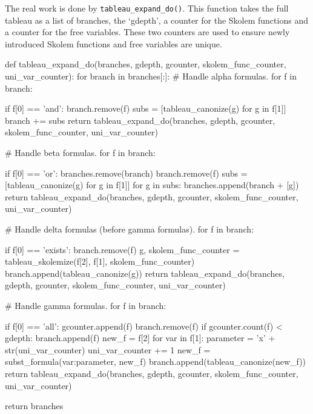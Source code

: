 \documentclass[a4paper,notitlepage]{scrartcl}
\begin{document}
The real work is done by \texttt{tableau\_expand\_do()}. This function takes the
full tableau as a list of branches, the `gdepth', a counter for the Skolem
functions and a counter for the free variables. These two counters are used to
ensure newly introduced Skolem functions and free variables are unique.

\begin{code}
def tableau_expand_do(branches, gdepth, gcounter, skolem_func_counter, uni_var_counter):
    for branch in branches[:]:
        # Handle alpha formulas.
        for f in branch:

            if f[0] == 'and':
                branch.remove(f)
                subs = [tableau_canonize(g) for g in f[1]]
                branch += subs
                return tableau_expand_do(branches, gdepth, gcounter, skolem_func_counter, uni_var_counter)

        # Handle beta formulas.
        for f in branch:

            if f[0] == 'or':
                branches.remove(branch)
                branch.remove(f)
                subs = [tableau_canonize(g) for g in f[1]]
                for g in subs:
                    branches.append(branch + [g])
                return tableau_expand_do(branches, gdepth, gcounter, skolem_func_counter, uni_var_counter)

        # Handle delta formulas (before gamma formulas).
        for f in branch:

            if f[0] == 'exists':
                branch.remove(f)
                g, skolem_func_counter = tableau_skolemize(f[2], f[1],
                    skolem_func_counter)
                branch.append(tableau_canonize(g))
                return tableau_expand_do(branches, gdepth, gcounter, skolem_func_counter, uni_var_counter)

        # Handle gamma formulas.
        for f in branch:

            if f[0] == 'all':
                gcounter.append(f)
                branch.remove(f)
                if gcounter.count(f) < gdepth:
                    branch.append(f)
                new_f = f[2]
                for var in f[1]:
                    parameter =  'x' + str(uni_var_counter)
                    uni_var_counter += 1
                    new_f = subst_formula({var:parameter}, new_f)
                branch.append(tableau_canonize(new_f))
                return tableau_expand_do(branches, gdepth, gcounter, skolem_func_counter, uni_var_counter)

    return branches
\end{code}
\end{document}
